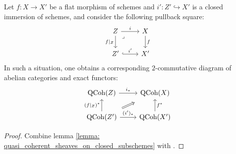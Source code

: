             \begin{lemma} \label{prop: flat_base_changes_of_quasi_coherent_sheaves_on_closed_subschemes}
                Let $f: X \to X'$ be a flat morphism of schemes and $i': Z' \hookrightarrow X'$ is a closed immersion of schemes, and consider the following pullback square:
                    $$
                        \begin{tikzcd}
                        	Z & X \\
                        	{Z'} & {X'}
                        	\arrow["{f|_Z}"', from=1-1, to=2-1]
                        	\arrow["{i'}", hook, from=2-1, to=2-2]
                        	\arrow["f", from=1-2, to=2-2]
                        	\arrow["i", from=1-1, to=1-2]
                        	\arrow["\lrcorner"{anchor=center, pos=0.125}, draw=none, from=1-1, to=2-2]
                        \end{tikzcd}
                    $$
                In such a situation, one obtains a corresponding $2$-commutative diagram of abelian categories and exact functors:
                    $$
                        \begin{tikzcd}
                        	{\QCoh(Z)} & {\QCoh(X)} \\
                        	{\QCoh(Z')} & {\QCoh(X')}
                        	\arrow["{(f|_Z)^*}", from=2-1, to=1-1]
                        	\arrow["{(i')_*}", from=2-1, to=2-2]
                        	\arrow["{i_*}", from=1-1, to=1-2]
                        	\arrow["{f^*}"', from=2-2, to=1-2]
                        	\arrow[shorten <=11pt, shorten >=11pt, Rightarrow, from=2-1, to=1-2]
                        \end{tikzcd}
                    $$
            \end{lemma}
                \begin{proof}
                    Combine lemma \ref{lemma: quasi_coherent_sheaves_on_closed_subschemes} with \cite[\href{https://stacks.math.columbia.edu/tag/02KH}{Tag 02KH}]{stacks}.
                \end{proof}
